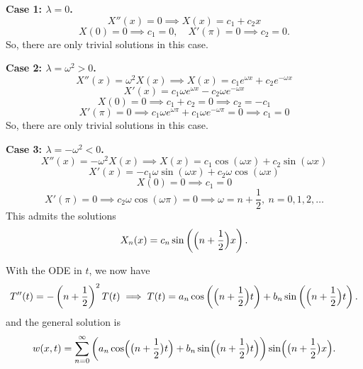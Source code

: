 \documentclass[plain]{pset}
\begin{document}
\begin{solution}
    \textbf{Case 1: \(\lambda = 0\).}
    \[X''(x) = 0 \implies X(x) = c_1 + c_2x\]
    \[X(0) = 0 \implies c_1 = 0, \quad X'(\pi) = 0 \implies c_2 = 0.\]
    So, there are only trivial solutions in this case.

    \textbf{Case 2: \(\lambda = \omega^2 > 0\).}
    \[X''(x) = \omega^2 X(x) \implies X(x) = c_1e^{\omega x} + c_2e^{-\omega x}\]
    \[X'(x) = c_1\omega e^{\omega x} - c_2\omega e^{-\omega x}\]
    \[X(0) = 0 \implies c_1 + c_2 = 0 \implies c_2 = -c_1\]
    \[X'(\pi) = 0 \implies c_1\omega e^{\omega \pi} + c_1\omega e^{-\omega \pi} = 0 \implies c_1 = 0\]
    So, there are only trivial solutions in this case.

    \textbf{Case 3: \(\lambda = -\omega^2 < 0\).}
    \[X''(x) = -\omega^2 X(x) \implies X(x) = c_1\cos(\omega x) + c_2\sin(\omega x)\]
    \[X'(x) = -c_1\omega\sin(\omega x) + c_2\omega\cos(\omega x)\]
    \[X(0) = 0 \implies c_1 = 0\]
    \[X'(\pi) = 0 \implies c_2\omega\cos(\omega \pi) = 0 \implies \omega = n + \frac{1}{2}, \> n = 0, 1, 2, \ldots\]
    This admits the solutions
    \[X_n(x) = c_n\sin\left(\Bigl(n + \frac{1}{2}\Bigr)x\right).\]

    With the ODE in \(t\), we now have
    \[T''(t) = -\left(n + \frac{1}{2}\right)^2 T(t) \implies T(t) = a_n\cos\left(\Bigl(n + \frac{1}{2}\Bigr)t\right) + b_n\sin\left(\Bigl(n + \frac{1}{2}\Bigr)t\right).\]
    and the general solution is
    \[w(x, t) = \sum_{n = 0}^\infty \left(a_n\cos\Bigl(\bigl(n + \frac{1}{2}\bigr)t\Bigr) + b_n\sin\Bigl(\bigl(n + \frac{1}{2}\bigr)t\Bigr)\right) \sin\Bigl(\bigl(n + \frac{1}{2}\bigr)x\Bigr).\]


\end{solution}
\end{document}

